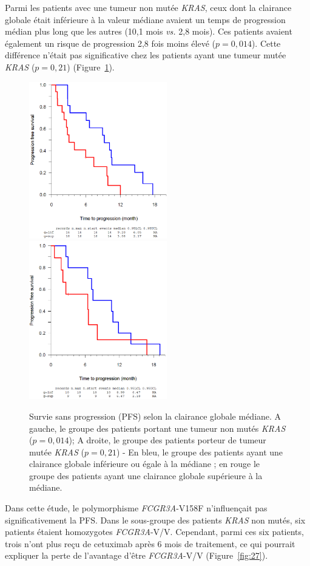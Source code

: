 Parmi les patients avec une tumeur non mutée \textit{KRAS}, ceux dont la clairance globale était inférieure à la valeur médiane avaient un temps de progression médian plus long que les autres (10,1 mois \textit{vs.} 2,8 mois). Ces patients avaient également un risque de progression 2,8 fois moins élevé ($p = 0,014$). Cette différence n'était pas significative chez les patients ayant une tumeur mutée \textit{KRAS} ($p = 0,21$) (Figure~\ref{fig:26}).
\begin{figure}[htbp]
	\centering
		\includegraphics[width=6cm]{figures/raster/FIG_26a}
		\includegraphics[width=6cm]{figures/raster/FIG_26b}
	\caption{Survie sans progression (PFS) selon la clairance globale médiane. A gauche, le groupe des patients portant une tumeur non mutés \textit{KRAS} ($p = 0,014$); A droite, le groupe des patients porteur de tumeur mutée \textit{KRAS} ($p = 0,21$) - En bleu, le groupe des patients ayant une clairance globale inférieure ou égale à la médiane ; en rouge le groupe des patients ayant une clairance globale supérieure à la médiane.}
	\label{fig:26}
\end{figure} 
Dans cette étude, le polymorphisme \textit{FCGR3A}-V158F n'influençait pas significativement la PFS. Dans le sous-groupe des patients \textit{KRAS} non mutés, six patients étaient homozygotes \textit{FCGR3A}-V/V. Cependant, parmi ces six patients, trois n'ont plus reçu de cetuximab après 6 mois de traitement, ce qui pourrait expliquer la perte de l'avantage d'être \textit{FCGR3A}-V/V (Figure~\ref{fig:27}). 
